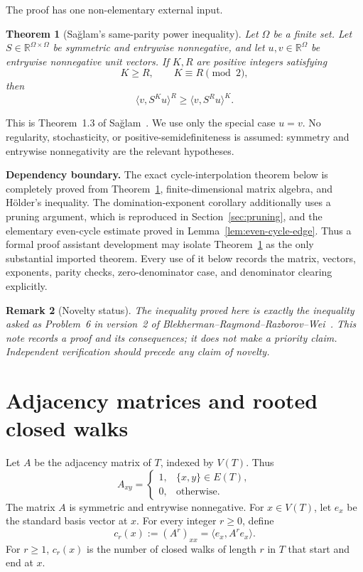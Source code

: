 \documentclass[11pt]{article}
\newtheorem{theorem}{Theorem}[section]
\newtheorem{remark}[theorem]{Remark}
\newcommand{\RR}{\mathbb{R}}
\newcommand{\1}{\mathbf{1}}
\begin{document}
The proof has one non-elementary external input.

\begin{theorem}[Sa\u{g}lam's same-parity power inequality]\label{thm:saglam}
Let $\Omega$ be a finite set.  Let $S\in\RR^{\Omega\times\Omega}$ be symmetric
and entrywise nonnegative, and let $u,v\in\RR^\Omega$ be entrywise nonnegative
unit vectors.  If $K,R$ are positive integers satisfying
\[
  K\ge R,
  \qquad
  K\equiv R\pmod 2,
\]
then
\[
  \langle v,S^K u\rangle^R
  \ge
  \langle v,S^R u\rangle^K.
\]
\end{theorem}

This is Theorem~1.3 of Sa\u{g}lam~\cite{Saglam2018}.  We use only the special
case $u=v$.  No regularity, stochasticity, or positive-semidefiniteness is
assumed: symmetry and entrywise nonnegativity are the relevant hypotheses.

\medskip
\noindent
\textbf{Dependency boundary.}
The exact cycle-interpolation theorem below is completely proved from
Theorem~\ref{thm:saglam}, finite-dimensional matrix algebra, and H\"older's
inequality.  The domination-exponent corollary additionally uses a pruning
argument, which is reproduced in Section~\ref{sec:pruning}, and the elementary
even-cycle estimate proved in Lemma~\ref{lem:even-cycle-edge}.  Thus a formal
proof assistant development may isolate Theorem~\ref{thm:saglam} as the only
substantial imported theorem.  Every use of it below records the matrix,
vectors, exponents, parity checks, zero-denominator case, and denominator
clearing explicitly.

\begin{remark}[Novelty status]
The inequality proved here is exactly the inequality asked as Problem~6 in
version~2 of Blekherman--Raymond--Razborov--Wei~\cite{BRRW2025}.  This note
records a proof and its consequences; it does not make a priority claim.
Independent verification should precede any claim of novelty.
\end{remark}

\section{Adjacency matrices and rooted closed walks}

Let $A$ be the adjacency matrix of $T$, indexed by $V(T)$.  Thus
\[
  A_{xy}=\begin{cases}
  1,&\{x,y\}\in E(T),\\
  0,&\text{otherwise}.
  \end{cases}
\]
The matrix $A$ is symmetric and entrywise nonnegative.  For $x\in V(T)$, let
$e_x$ be the standard basis vector at $x$.  For every integer $r\ge0$, define
\[
  c_r(x):=(A^r)_{xx}=\langle e_x,A^r e_x\rangle.
\]
For $r\ge1$, $c_r(x)$ is the number of closed walks of length $r$ in $T$ that
start and end at $x$.
\end{document}
